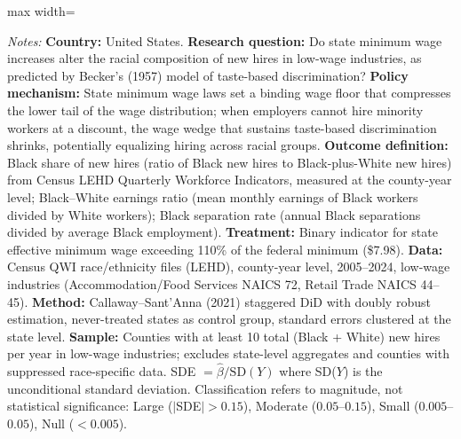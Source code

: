 \begin{table}[H]
\begin{adjustbox}{max width=\textwidth}
\begin{threeparttable}
\begin{tablenotes}[flushleft]
\item \textit{Notes:} \textbf{Country:} United States. \textbf{Research question:} Do state minimum wage increases alter the racial composition of new hires in low-wage industries, as predicted by Becker's (1957) model of taste-based discrimination? \textbf{Policy mechanism:} State minimum wage laws set a binding wage floor that compresses the lower tail of the wage distribution; when employers cannot hire minority workers at a discount, the wage wedge that sustains taste-based discrimination shrinks, potentially equalizing hiring across racial groups. \textbf{Outcome definition:} Black share of new hires (ratio of Black new hires to Black-plus-White new hires) from Census LEHD Quarterly Workforce Indicators, measured at the county-year level; Black--White earnings ratio (mean monthly earnings of Black workers divided by White workers); Black separation rate (annual Black separations divided by average Black employment). \textbf{Treatment:} Binary indicator for state effective minimum wage exceeding 110\% of the federal minimum (\$7.98). \textbf{Data:} Census QWI race/ethnicity files (LEHD), county-year level, 2005--2024, low-wage industries (Accommodation/Food Services NAICS 72, Retail Trade NAICS 44--45). \textbf{Method:} Callaway--Sant'Anna (2021) staggered DiD with doubly robust estimation, never-treated states as control group, standard errors clustered at the state level. \textbf{Sample:} Counties with at least 10 total (Black + White) new hires per year in low-wage industries; excludes state-level aggregates and counties with suppressed race-specific data. SDE $= \hat{\beta} / \text{SD}(Y)$ where SD($Y$) is the unconditional standard deviation. Classification refers to magnitude, not statistical significance: Large ($|$SDE$| > 0.15$), Moderate ($0.05$--$0.15$), Small ($0.005$--$0.05$), Null ($< 0.005$).
\end{tablenotes}
\end{threeparttable}
\end{adjustbox}
\end{table}

